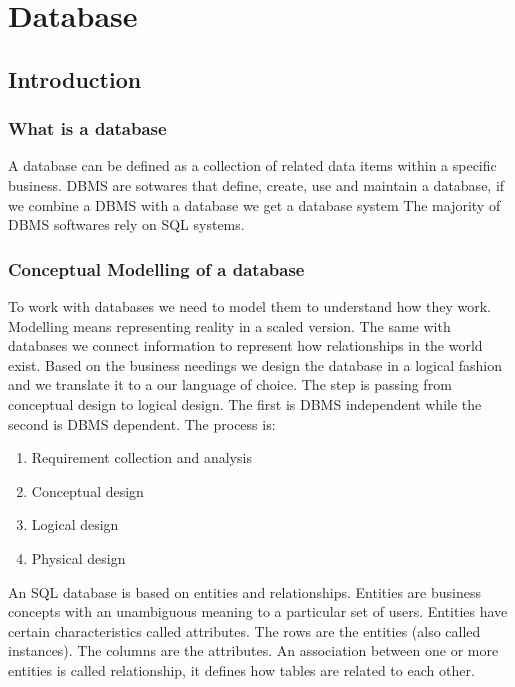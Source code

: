 \section{Database}


\subsection{Introduction}

\subsubsection{What is a database}

A database can be defined as a collection of related data items within a specific business.
DBMS are sotwares that define, create, use and maintain a database, if we combine a DBMS with a database we get a database system
The majority of DBMS softwares rely on SQL systems. 

\subsubsection{Conceptual Modelling of a database}

\vspace{10pt}

To work with databases we need to model them to understand how they work. Modelling means representing reality in a 
scaled version. The same with databases we connect information to represent how relationships in the world exist.
Based on the business needings we design the database in a logical fashion and we translate it to 
a our language of choice. The step is passing from conceptual design to logical design. The first is DBMS independent while the second is DBMS dependent.
The process is:

\begin{enumerate}
    \item Requirement collection and analysis
    \item Conceptual design
    \item Logical design
    \item Physical design
\end{enumerate}

\vspace{10pt}

An SQL database is based on entities and relationships. Entities are business concepts
with an unambiguous meaning to a particular set of users. Entities have certain characteristics called attributes.
The rows are the entities (also called instances). The columns are the attributes. An association 
between one or more entities is called relationship, it defines how tables are related to each other. 

